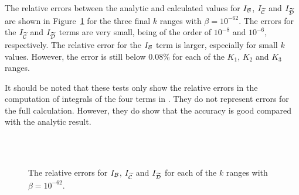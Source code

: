 % 
The relative errors between the analytic and calculated values for $I_\B$,
$I_{\wt{\C}}$ and $I_{\wt{\D}}$ are shown in Figure~\ref{fig:rel-bcd-num} for the
three final $k$ ranges with $\beta=10^{-62}$. The errors
for the $I_{\wt{\C}}$ and $I_{\wt{\D}}$ terms are very small, being of the order of
$10^{-8}$ and $10^{-6}$, respectively. The relative error for the $I_\B$ term is
larger, especially for small $k$ values. However, the error is still below $0.08\%$
for each of the $K_1$, $K_2$ and $K_3$ ranges.


It should be noted that these tests only show the relative errors in the
computation of integrals of the four terms in . They
do not represent
errors for the full calculation. However, they do show that the accuracy is good
compared with the analytic result. 

\begin{figure}[htbp]
\centering%
\\%
\\%
%
\caption[Relative errors for $I_\B$, $I_{\wt{\C}}$ and $I_{\wt{\D}}$]{The relative
errors for $I_\B$,
$I_{\wt{\C}}$ and $I_{\wt{\D}}$ for each of the $k$ ranges with $\beta=10^{-62}$.}
\label{fig:rel-bcd-num}
\end{figure}


